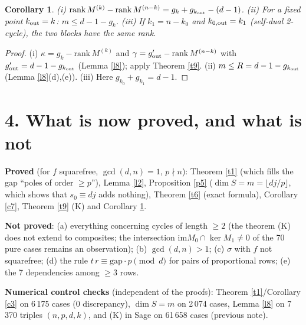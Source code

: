 \documentclass[11pt,a4paper]{article}
\newtheorem{cor}[thm]{Corollary}
\theoremstyle{remark}\newtheorem*{rem}{Remark}
\begin{document}
\begin{cor}\label{c10} (i) $\mathrm{rank}\,M^{(k)}-\mathrm{rank}\,M^{(n-k)}=g_k+g_{k_{\rm out}}-(d-1)$. (ii) For a fixed point $k_{\rm out}=k$: $m\le d-1-g_k$. (iii) If $k_1=n-k_0$ and $k_{0,\rm out}=k_1$ (self-dual 2-cycle), the two blocks have the same rank.\end{cor}
\begin{proof} (i) $\kappa=g_k-\mathrm{rank}\,M^{(k)}$ and $\gamma=g'_{\rm out}-\mathrm{rank}\,M^{(n-k)}$ with $g'_{\rm out}=d-1-g_{k_{\rm out}}$ (Lemma \ref{l8}); apply Theorem \ref{t9}. (ii) $m\le R=d-1-g_{k_{\rm out}}$ (Lemma \ref{l8}(d),(e)). (iii) Here $g_{k_0}+g_{k_1}=d-1$.\end{proof}

\section*{4. What is now proved, and what is not}
\noindent\textbf{Proved} (for $f$ squarefree, $\gcd(d,n)=1$, $p\nmid n$): Theorem \ref{t1} (which fills the gap ``poles of order $\ge p$''), Lemma \ref{l2}, Proposition \ref{p5} ($\dim S=m=\lfloor dj/p\rfloor$, which shows that $s_0\equiv dj$ adds nothing), Theorem \ref{t6} (exact formula), Corollary \ref{c7}, Theorem \ref{t9} (K) and Corollary \ref{c10}.

\noindent\textbf{Not proved}: (a) everything concerning cycles of length $\ge2$ (the theorem (K) does not extend to composites; the intersection $\mathrm{im}M_0\cap\ker M_1\ne0$ of the 70 pure cases remains an observation); (b) $\gcd(d,n)>1$; (c) $\sigma$ with $f$ not squarefree; (d) the rule $t\,r\equiv\mathrm{gap}\cdot p\pmod d$ for pairs of proportional rows; (e) the 7 dependencies among $\ge3$ rows.

\noindent\textbf{Numerical control checks} (independent of the proofs): Theorem \ref{t1}/Corollary \ref{c3} on 6\,175 cases (0 discrepancy), $\dim S=m$ on 2\,074 cases, Lemma \ref{l8} on 7\,370 triples $(n,p,d,k)$, and (K) in Sage on 61\,658 cases (previous note).
\end{document}
